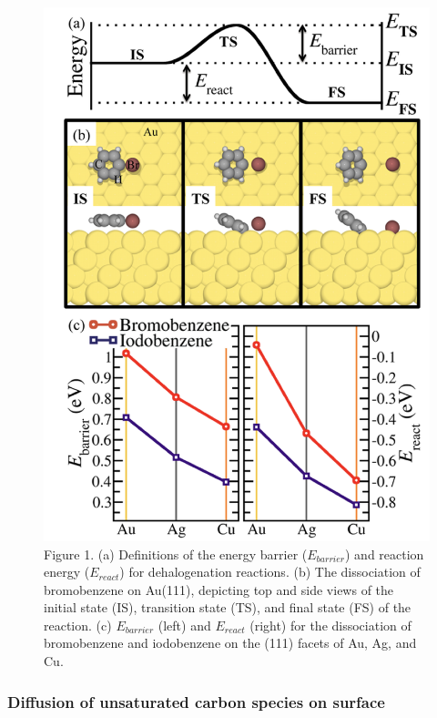 \documentclass[%
 reprint,
 amsmath,amssymb,
 aps,
prb,
]{revtex4-1}
\begin{document}
\begin{figure}[tbh]
\centering
\includegraphics[width=0.75\columnwidth]{Fig/dehalogentaion.png}
\caption{Figure 1. (a) Definitions of the energy barrier ($E_{barrier}$) and reaction energy ($E_{react}$) for dehalogenation reactions. (b) The dissociation of bromobenzene on Au(111), depicting top and side views of the initial state (IS), transition state (TS), and final state (FS) of the reaction. (c) $E_{barrier}$ (left) and $E_{react}$ (right) for the dissociation of bromobenzene and iodobenzene on the (111) facets of Au, Ag, and Cu.} 
\label{fig:dehalo}
\end{figure}

\subsubsection{Diffusion of unsaturated carbon species on surface}
\end{document}
